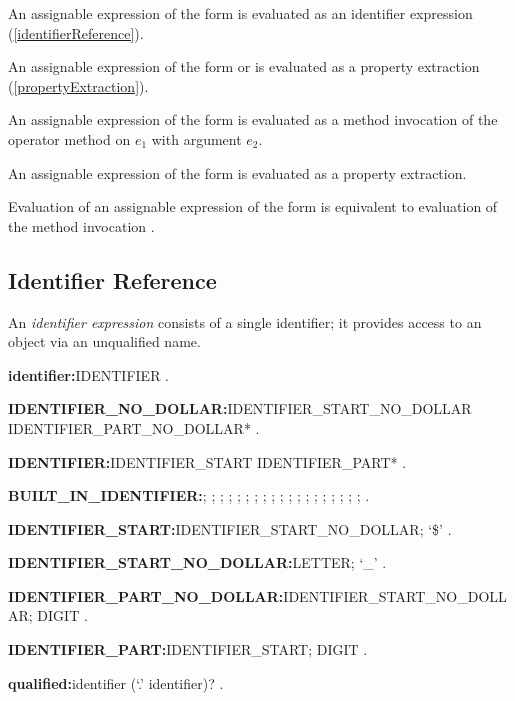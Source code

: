 \documentclass{article}
\begin{document}
\LMHash{}
An assignable expression of the form \id{} is evaluated as an identifier expression (\ref{identifierReference}).


\LMHash{}
An assignable expression of the form  or  is evaluated as a property extraction (\ref{propertyExtraction}).

\LMHash{}
An assignable expression of the form  is evaluated as a method invocation of the operator method \code{[]} on $e_1$ with argument $e_2$.

\LMHash{}
An assignable expression of the form  is evaluated as a property extraction.

\LMHash{}
Evaluation of an assignable expression of the form \code{\SUPER{}[$e_2$]} is equivalent to evaluation of the method invocation .


\subsection{Identifier Reference}

\LMHash{}
An {\em identifier expression} consists of a single identifier; it provides access to an object via an unqualified name.

\begin{grammar}
{\bf identifier:}IDENTIFIER
  .

{\bf IDENTIFIER\_NO\_DOLLAR:}IDENTIFIER\_START\_NO\_DOLLAR
  \gnewline{} IDENTIFIER\_PART\_NO\_DOLLAR*
  .

{\bf IDENTIFIER:}IDENTIFIER\_START IDENTIFIER\_PART*
  .

{\bf BUILT\_IN\_IDENTIFIER:}\ABSTRACT{};
  \AS{};
  \COVARIANT{};
  \DEFERRED{};
  \DYNAMIC{};
  \EXPORT{};
  \EXTERNAL{};
  \FACTORY{};
  \FUNCTION{};
  \GET{};
  \IMPLEMENTS{};
  \IMPORT{};
  \INTERFACE{};
  \LIBRARY{};
  \OPERATOR{};
  \MIXIN{};
  \PART{};
  \SET{};
  \STATIC{};
  \TYPEDEF{}
  .

{\bf IDENTIFIER\_START:}IDENTIFIER\_START\_NO\_DOLLAR;
  `\$'
  .

{\bf IDENTIFIER\_START\_NO\_DOLLAR:}LETTER;
  `\_'
  .

{\bf IDENTIFIER\_PART\_NO\_DOLLAR:}IDENTIFIER\_START\_NO\_DOLLAR;
  DIGIT
  .

{\bf IDENTIFIER\_PART:}IDENTIFIER\_START;
  DIGIT
  .

{\bf qualified:}identifier (`{\escapegrammar .}' identifier)?
  .
\end{grammar}
\end{document}
